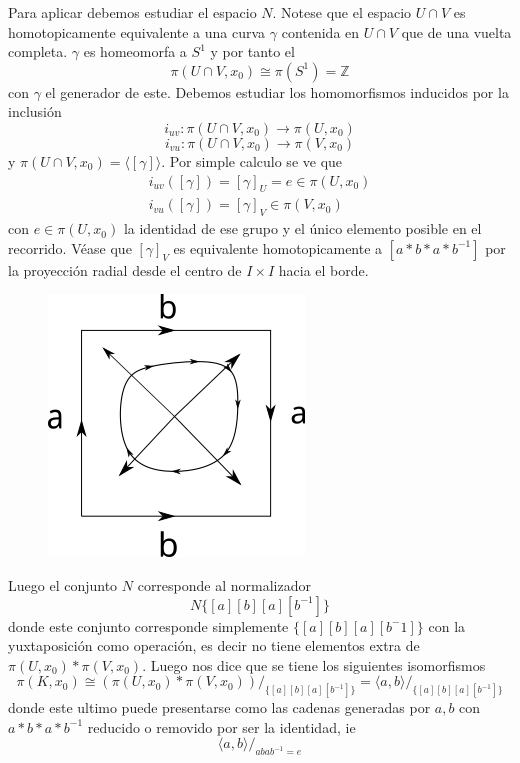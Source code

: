 \begin{ejemplo}
  Para aplicar \vank debemos estudiar el espacio \(N\). Notese que el
  espacio \(U \cap V\) es homotopicamente equivalente a una curva
  \(\gamma\) contenida en \(U \cap V\) que de una vuelta completa.
  \(\gamma\) es homeomorfa a \(S^1\) y por tanto el
  \[\pi (U \cap V, x_0) \cong \pi (S^1) = \mathbb Z \]
  con \(\gamma\) el generador de este. Debemos estudiar los
  homomorfismos inducidos por la inclusión
  \[ i_{u v} : \pi (U \cap V , x_0) \longrightarrow \pi (U, x_0) \]
  \[ i_{v u} : \pi (U \cap V , x_0) \longrightarrow \pi (V, x_0) \]
  y \(  \pi (U \cap V , x_0) = \langle {[\gamma]} \rangle \). Por
  simple calculo se ve que
  \begin{gather*}
    i_{u v} ([\gamma]) = [\gamma]_{U} = e \in \pi \left( U, x_0 \right)
    \\
    i_{v u} ([\gamma]) = [\gamma]_{V} \in \pi \left( V, x_0 \right)
  \end{gather*}
  con \(e \in \pi \left( U, x_0 \right)\) la identidad de ese grupo y el
  único elemento posible en el recorrido. Véase que \([\gamma]_V\) es
  equivalente homotopicamente a \([a * b * a * b^{-1}]\) por la proyección
  radial desde el centro de \(I \times I\) hacia el borde.
  \begin{figure}[h]
    \centering \includegraphics[scale=0.5]{./imagenes/radial.png}
  \end{figure}
  Luego el conjunto \(N\) corresponde al normalizador
  \[ N \{ [a] [b] [a] [b^{-1}]\}\]
  donde este conjunto corresponde simplemente \(\{ [a] [b] [a]
  [b^-1]\}\) con la yuxtaposición como operación, es decir no tiene
  elementos extra de \(\pi (U,x_0) * \pi (V, x_0)\). Luego \vank nos
  dice que se tiene los siguientes isomorfismos
  \[ \pi (K, x_0) \cong \left( \pi (U, x_0) * \pi (V, x_0) \right)
      /_{\{[a] [b] [a] [b^{-1}]\}} = \langle {a , b} \rangle
      /_{\{[a] [b] [a] [b^{-1}]\}}\]
  donde este ultimo puede presentarse como las cadenas generadas por
  \(a,b\) con \(a * b * a * b^{-1} \) reducido o removido por ser la
  identidad, ie
  \[ \langle a,b \rangle /_{abab^{-1} = e} \]
\end{ejemplo}

